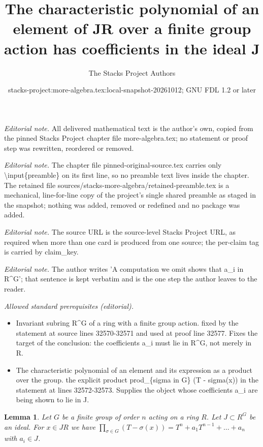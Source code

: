 \documentclass[10pt,a4paper]{amsart}
\title{The characteristic polynomial of an element of JR over a finite group action has coefficients in the ideal J}
\author{The Stacks Project Authors}
\date{stacks-project:more-algebra.tex:local-snapshot-20261012; GNU FDL 1.2 or later}
\theoremstyle{plain}
\newtheorem{lemma}[subsection]{Lemma}
\theoremstyle{definition}
\theoremstyle{remark}
\numberwithin{equation}{subsection}
\begin{document}
\maketitle
\setcounter{subsection}{1}
\noindent\textit{Editorial note.} All delivered mathematical text is the author's own, copied from the pinned Stacks Project chapter file more-algebra.tex; no statement or proof step was rewritten, reordered or removed.\par\medskip
\noindent\textit{Editorial note.} The chapter file pinned-original-source.tex carries only \textbackslash{}input\{preamble\} on its first line, so no preamble text lives inside the chapter. The retained file sources/stacks-more-algebra/retained-preamble.tex is a mechanical, line-for-line copy of the project's single shared preamble as staged in the snapshot; nothing was added, removed or redefined and no package was added.\par\medskip
\noindent\textit{Editorial note.} The source URL is the source-level Stacks Project URL, as required when more than one card is produced from one source; the per-claim tag is carried by claim\_key.\par\medskip
\noindent\textit{Editorial note.} The author writes 'A computation we omit shows that a\_i in R\textasciicircum{}G'; that sentence is kept verbatim and is the one step the author leaves to the reader.\par\medskip
\noindent\textit{Allowed standard prerequisites (editorial).}\begin{itemize}
\item Invariant subring R\textasciicircum{}G of a ring with a finite group action. fixed by the statement at source lines 32570-32571 and used at proof line 32577. Fixes the target of the conclusion: the coefficients a\_i must lie in R\textasciicircum{}G, not merely in R.
\item The characteristic polynomial of an element and its expression as a product over the group. the explicit product prod\_\{sigma in G\} (T - sigma(x)) in the statement at lines 32572-32573. Supplies the object whose coefficients a\_i are being shown to lie in J.
\end{itemize}\medskip
\begin{lemma}
\label{lemma-pol-in-ideal}
Let $G$ be a finite group of order $n$ acting on a ring $R$.
Let $J \subset R^G$ be an ideal. For $x \in JR$
we have $\prod_{\sigma \in G} (T - \sigma(x)) =
T^n + a_1 T^{n - 1} + \ldots + a_n$ with $a_i \in J$.
\end{lemma}
\end{document}
